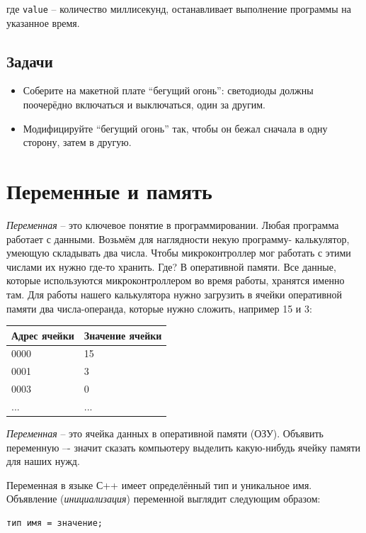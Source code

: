 \documentclass[a4paper,twoside]{book}
\begin{document}
где \texttt{value} -- количество миллисекунд, останавливает выполнение программы
на указанное время.

\subsection{Задачи}
\begin{itemize}
\item Соберите на макетной плате ``бегущий огонь'': светодиоды должны поочерёдно
  включаться и выключаться, один за другим.
\item Модифицируйте ``бегущий огонь'' так, чтобы он бежал сначала в одну
  сторону, затем в другую.
\end{itemize}

\section{Переменные и память}

\emph{Переменная} -- это ключевое понятие в программировании. Любая программа
работает с данными. Возьмём для наглядности некую программу- калькулятор,
умеющую складывать два числа. Чтобы микроконтроллер мог работать с этими числами
их нужно где-то хранить. Где? В оперативной памяти. Все данные, которые
используются микроконтроллером во время работы, хранятся именно там. Для работы
нашего калькулятора нужно загрузить в ячейки оперативной памяти два
числа-операнда, которые нужно сложить, например 15 и 3:

\begin{tabular}{p{4cm}|p{6cm}}
  Адрес ячейки & Значение ячейки \\
  \hline \hline
  0000 & 15 \\
  \hline
  0001 & 3 \\
  \hline
  0003 & 0 \\
  ... & ... \\
\end{tabular}

\emph{Переменная} -- это ячейка данных в оперативной памяти (ОЗУ). Объявить
переменную –- значит сказать компьютеру выделить какую-нибудь ячейку памяти для
наших нужд.

Переменная в языке С++ имеет определённый тип и уникальное имя. Объявление
(\emph{инициализация}) переменной выглядит следующим образом:

\begin{verbatim}
тип имя = значение;
\end{verbatim}
\end{document}
